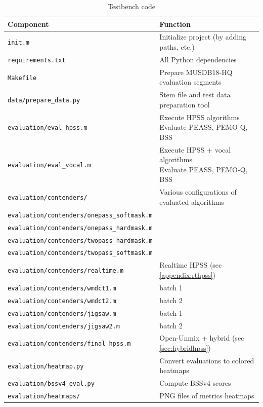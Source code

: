 \documentclass[letter,12pt]{article}
\begin{document}
\begin{appendices}
\begin{table}[ht]
	\centering
\begin{tabular}{ |l|l| }
	 \hline
	  Component & Function \\
	 \hline
	 \hline
	 \Verb#init.m# & Initialize project (by adding paths, etc.) \\
	 \hline
	 \Verb#requirements.txt# & All Python dependencies \\
	 \hline
	 \Verb#Makefile# & Prepare MUSDB18-HQ evaluation segments \\
	 \hline
	 \Verb#data/prepare_data.py# & Stem file and test data preparation tool \\
	 \hline
	 \Verb#evaluation/eval_hpss.m# & \makecell[l] { Execute HPSS algorithms \\ Evaluate PEASS, PEMO-Q, BSS } \\
	 \hline
	 \Verb#evaluation/eval_vocal.m# & \makecell[l] { Execute HPSS + vocal algorithms \\ Evaluate PEASS, PEMO-Q, BSS } \\
	 \hline
	 \Verb#evaluation/contenders/# & Various configurations of evaluated algorithms \\
	 \Verb#evaluation/contenders/onepass_softmask.m# & \citet{fitzgerald1} \\
	 \Verb#evaluation/contenders/onepass_hardmask.m# & \citet{driedger} \\
	 \Verb#evaluation/contenders/twopass_hardmask.m# & \citet{driedger} \\
	 \Verb#evaluation/contenders/twopass_softmask.m# & \citet{fitzgerald2} \\
	 \Verb#evaluation/contenders/realtime.m# & Realtime HPSS (sec \ref{appendix:rthpss}) \\
	 \Verb#evaluation/contenders/wmdct1.m# & \citet{wmdct} batch 1 \\
	 \Verb#evaluation/contenders/wmdct2.m# & \citet{wmdct} batch 2 \\
	 \Verb#evaluation/contenders/jigsaw.m# & \citet{tfjigsaw} batch 1 \\
	 \Verb#evaluation/contenders/jigsaw2.m# & \citet{tfjigsaw} batch 2 \\
	 \Verb#evaluation/contenders/final_hpss.m# & Open-Unmix + hybrid (sec \ref{sec:hybridhpss}) \\
	 \hline
	 \Verb#evaluation/heatmap.py# & Convert evaluations to colored heatmaps \\
	 \hline
	 \Verb#evaluation/bssv4_eval.py# & Compute BSSv4 scores \\
	 \hline
	 \Verb#evaluation/heatmaps/# & PNG files of metrics heatmaps \\
	 \hline
\end{tabular}
	\caption{Testbench code}
	\label{table:testbenchcode}
\end{table}

\end{appendices}
\end{document}
